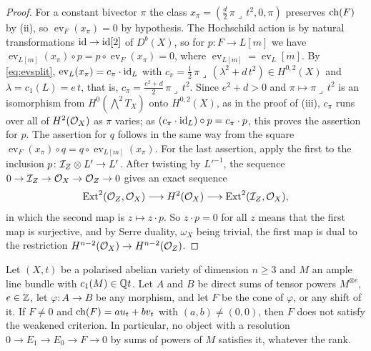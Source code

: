 \begin{proof}
For a constant bivector $\pi$ the class
$x_{\pi}=(\tfrac d2\,\pi\lrcorner\,t^{2},0,\pi)$ preserves $\operatorname{ch}(F)$ by
(ii), so $\operatorname{ev}_{F}(x_{\pi})=0$ by hypothesis.
The Hochschild action is by natural transformations $\operatorname{id}\to\operatorname{id}[2]$ of
$D^{b}(X)$, so for $p\colon F\to L[m]$ we have
$\operatorname{ev}_{L[m]}(x_{\pi})\circ p=p\circ\operatorname{ev}_{F}(x_{\pi})=0$,
where $\operatorname{ev}_{L[m]}=\operatorname{ev}_{L}[m]$. By
\eqref{eq:evsplit}, $\operatorname{ev}_{L}(x_{\pi})=c_{\pi}\cdot\operatorname{id}_{L}$ with
$c_{\pi}=\tfrac12\,\pi\lrcorner\,(\lambda^{2}+d\,t^{2})\in H^{0,2}(X)$ and
$\lambda=c_{1}(L)=e\,t$, that is,
$c_{\pi}=\tfrac{e^{2}+d}{2}\,\pi\lrcorner\,t^{2}$. Since $e^{2}+d>0$ and
$\pi\mapsto\pi\lrcorner\,t^{2}$ is an isomorphism from
$H^{0}(\bigwedge^{2}T_{X})$ onto $H^{0,2}(X)$, as in the proof of
(iii), $c_{\pi}$ runs over all of $H^{2}(\mathcal{O}_{X})$ as $\pi$
varies; as $(c_{\pi}\cdot\operatorname{id}_{L})\circ p=c_{\pi}\cdot p$, this proves the
assertion for $p$. The assertion for $q$ follows in the same way from the
square
$\operatorname{ev}_{F}(x_{\pi})\circ q=q\circ\operatorname{ev}_{L[m]}(x_{\pi})$.
For the last assertion, apply the first to the inclusion
$p\colon\mathcal{I}_{Z}\otimes L'\to L'$. After twisting by $L'^{-1}$, the sequence
$0\to\mathcal{I}_{Z}\to\mathcal{O}_{X}\to\mathcal{O}_{Z}\to0$ gives an exact sequence
\[
  \operatorname{Ext}^{2}(\mathcal{O}_{Z},\mathcal{O}_{X})\longrightarrow H^{2}(\mathcal{O}_{X})
  \longrightarrow\operatorname{Ext}^{2}(\mathcal{I}_{Z},\mathcal{O}_{X}),
\]
in which the second map is $z\mapsto z\cdot p$. So $z\cdot p=0$ for all $z$
means that the first map is surjective, and by Serre duality, $\omega_{X}$
being trivial, the first map is dual to the restriction
$H^{n-2}(\mathcal{O}_{X})\to H^{n-2}(\mathcal{O}_{Z})$.
\end{proof}

\begin{theorem}\label{thm:nosplit}
Let $(X,t)$ be a polarised abelian variety of dimension $n\ge3$ and $M$ an
ample line bundle with $c_{1}(M)\in\mathbb{Q} t$. Let $A$ and $B$ be direct sums of
tensor powers $M^{\otimes e}$, $e\in\mathbb{Z}$, let $\varphi\colon A\to B$ be any
morphism, and let $F$ be the cone of $\varphi$, or any shift of it. If $F\ne0$
and $\operatorname{ch}(F)=au_{t}+bv_{t}$ with $(a,b)\ne(0,0)$, then $F$ does not satisfy
the weakened criterion. In particular, no object with a resolution
$0\to E_{1}\to E_{0}\to F\to0$ by sums of powers of $M$ satisfies it,
whatever the rank.
\end{theorem}

